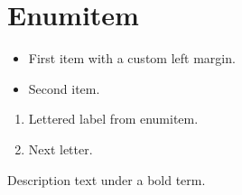 \documentclass{article}
\begin{document}
\section{Enumitem}
\begin{itemize}[leftmargin=2em]
\item First item with a custom left margin.
\item Second item.
\end{itemize}
\begin{enumerate}[label=\alph*]
\item Lettered label from enumitem.
\item Next letter.
\end{enumerate}
\begin{description}[font=\bfseries]
\item [Term] Description text under a bold term.
\end{description}
\end{document}
